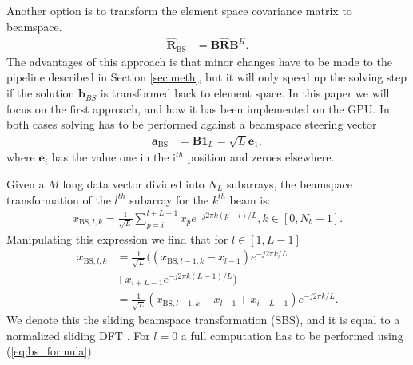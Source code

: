 \documentclass[journal]{IEEEtran}
\newcommand{\mat}[1]{\mathbf{#1}}
\renewcommand{\vec}[1]{\mathbf{#1}}
\begin{document}
Another option is to transform the element space covariance matrix to beamspace. 
\begin{align}
\mat{\hat{R}}_\text{BS} &= \mat{B}\mat{\hat{R}}\mat{B}^H.
\end{align}
The advantages of this approach is that minor changes have to be made to the pipeline described in Section \ref{sec:meth}, but it will only speed up the solving step if the solution $\vec{b}_{BS}$ is transformed back to element space. In this paper we will focus on the first approach, and how it has been implemented on the GPU.
In both cases solving has to be performed against a beamspace steering vector
\begin{align}
\vec{a}_\text{BS} &= \mat{B}\vec{1}_L = \sqrt{L}\vec{e}_1,
\end{align}
where $\vec{e}_i$ has the value one in the i$^{th}$ position and zeroes elsewhere.

Given a $M$ long data vector divided into $N_L$ subarrays, the beamspace transformation of the $l^{th}$ subarray for the $k^{th}$ beam is:
\begin{align}\label{eq:bs_formula}
x_{\text{BS},l,k} = \frac{1}{\sqrt{L}}\sum_{p=i}^{l+L-1}x_p e^{-j2\pi k(p-l)/L} , k \in [0, N_b-1].
\end{align}
Manipulating this expression we find that for $l \in [1, L-1]$
\begin{align}\label{eq:sliding_bs}
x_{\text{BS},l,k} &= \frac{1}{\sqrt{L}}((x_{\text{BS},l-1,k} - x_{l-1})e^{-j2\pi k/L} \nonumber \\ &+ x_{i+L-1}e^{-j2\pi k(L-1)/L}) \nonumber \\
&= \frac{1}{\sqrt{L}}(x_{\text{BS},l-1,k} - x_{l-1} + x_{i+L-1})e^{-j2\pi k/L}.
\end{align}
We denote this the sliding beamspace transformation (SBS), and it is equal to a normalized sliding DFT \cite{Lyons2003}. For $l=0$ a full computation has to be performed using (\ref{eq:bs_formula}).
\end{document}
